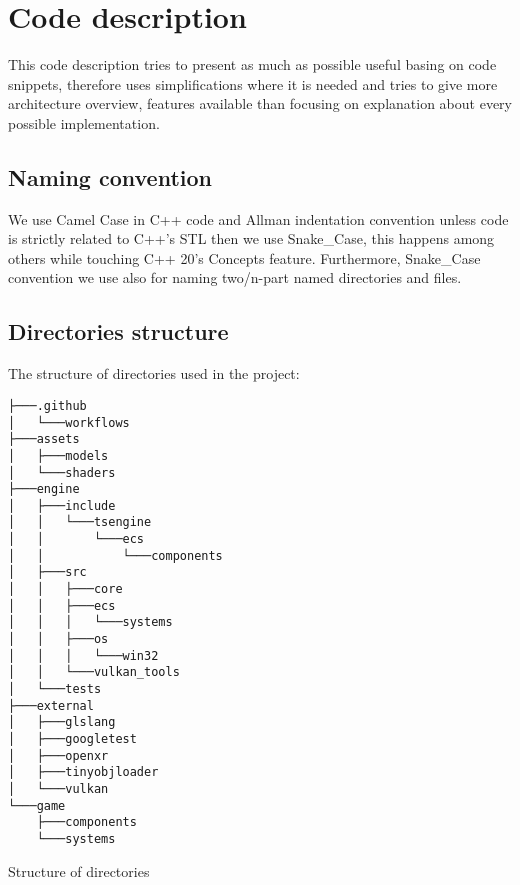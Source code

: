 \newpage
\section{Code description}
\label{sec:code_descr}
This code description tries to present as much as possible useful basing on code snippets, therefore uses simplifications where it is needed and tries to give more architecture overview, features available than focusing on explanation about every possible implementation.
\subsection{Naming convention}
We use Camel Case in C++ code and Allman indentation convention unless code is strictly related to C++'s STL then we use Snake\_Case, this happens among others while touching C++ 20's Concepts feature.
Furthermore, Snake\_Case convention we use also for naming two/n-part named directories and files.

\newpage
\subsection{Directories structure}
The structure of directories used in the project:
\begin{verbatim}
├───.github
│   └───workflows
├───assets
│   ├───models
│   └───shaders
├───engine
│   ├───include
│   │   └───tsengine
│   │       └───ecs
│   │           └───components
│   ├───src
│   │   ├───core
│   │   ├───ecs
│   │   │   └───systems
│   │   ├───os
│   │   │   └───win32
│   │   └───vulkan_tools
│   └───tests
├───external
│   ├───glslang
│   ├───googletest
│   ├───openxr
│   ├───tinyobjloader
│   └───vulkan
└───game
    ├───components
    └───systems
\end{verbatim}
\begin{table}[h]
\caption{Structure of directories}
\end{table}

\newpage

